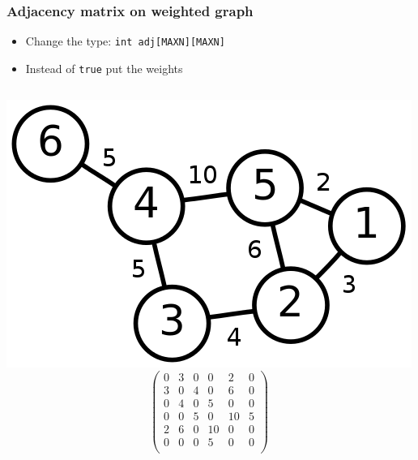 \documentclass[12pt]{beamer}
\begin{document}
\begin{frame}
\frametitle{Adjacency matrix on weighted graph}
\begin{itemize}
\item Change the type: \texttt{int adj[MAXN][MAXN]}
\item Instead of \texttt{true} put the weights
\end{itemize}
\begin{columns}
\flushright
\includegraphics[width=0.85\linewidth]{img/6n-weighted}
\[\left(
\begin{array}{cccccc}
0&3&0&0&2&0\\
3&0&4&0&6&0\\
0&4&0&5&0&0\\
0&0&5&0&10&5\\
2&6&0&10&0&0\\
0&0&0&5&0&0\\
\end{array}
\right)\]
\end{columns}
\end{frame}
\end{document}
